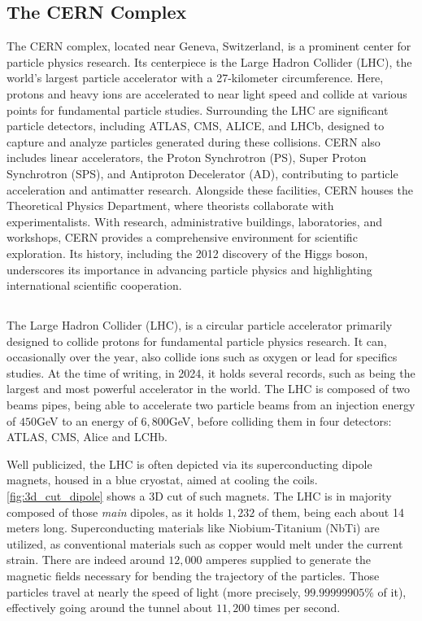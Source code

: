 \subsection{The CERN Complex}


The CERN complex, located near Geneva, Switzerland, is a prominent center for particle physics
research. Its centerpiece is the Large Hadron Collider (LHC), the world's largest particle
accelerator with a 27-kilometer circumference. Here, protons and heavy ions are accelerated to near
light speed and collide at various points for fundamental particle studies. Surrounding the LHC are
significant particle detectors, including ATLAS, CMS, ALICE, and LHCb, designed to capture and
analyze particles generated during these collisions.  CERN also includes linear accelerators, the
Proton Synchrotron (PS), Super Proton Synchrotron (SPS), and Antiproton Decelerator (AD),
contributing to particle acceleration and antimatter research. Alongside these facilities, CERN
houses the Theoretical Physics Department, where theorists collaborate with experimentalists. With
research, administrative buildings, laboratories, and workshops, CERN provides a comprehensive
environment for scientific exploration. Its history, including the 2012 discovery of the Higgs
boson, underscores its importance in advancing particle physics and highlighting international
scientific cooperation.



\subsection{}

The Large Hadron Collider (LHC), is a circular particle accelerator primarily designed to collide
protons for fundamental particle physics research. It can, occasionally over the year, also collide
ions such as oxygen or lead for specifics studies. At the time of writing, in 2024, it holds several
records, such as being the largest and most powerful accelerator in the world. The LHC is composed
of two beams pipes, being able to accelerate two particle beams from an injection energy of $450$GeV
to an energy of $6,800$GeV, before colliding them in four detectors: ATLAS, CMS, Alice and LCHb.

Well publicized, the LHC is often depicted via its superconducting dipole magnets, housed in a blue
cryostat, aimed at cooling the coils. \cref{fig:3d_cut_dipole} shows a 3D cut of such magnets. The
LHC is in majority composed of those \textit{main} dipoles, as it holds $1,232$ of them, being each
about 14 meters long. Superconducting materials like Niobium-Titanium (NbTi) are utilized, as
conventional materials such as copper would melt under the current strain. There are indeed around
$12,000$ amperes supplied to generate the magnetic fields necessary for bending the trajectory of
the particles.
Those particles travel at nearly the speed of light (more precisely, $99.99999905\%$ of it),
effectively going around the tunnel about $11,200$ times per second.

